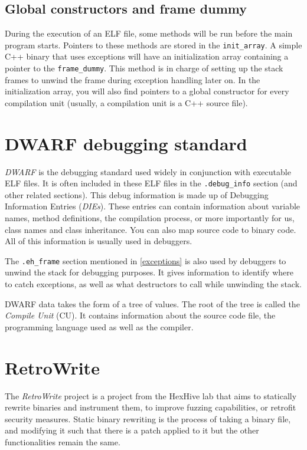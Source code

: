 \documentclass[a4paper,11pt,oneside]{report}
\begin{document}
\subsection{Global constructors and frame dummy}
\label{framedummy}

During the execution of an ELF file, some methods will be run before the main
program starts. Pointers to these methods are stored in the
\texttt{init\_array}.
A simple C++ binary that uses exceptions will have an initialization array
containing a pointer to the \texttt{frame\_dummy}. This method is in charge of
setting up the stack frames to unwind the frame during exception handling
later on.
In the initialization array, you will also find pointers to a global
constructor for every compilation unit (usually, a compilation unit is a C++
source file).


\section{DWARF debugging standard}
\label{dwarf}

\emph{DWARF} is the debugging standard used widely in conjunction with 
executable ELF files.
It is often included in these ELF files in the \texttt{.debug\_info} section 
(and other related sections).
This debug information is made up of Debugging Information Entries 
(\emph{DIEs}).
These entries can contain information about variable names, method definitions, 
the compilation process, or more importantly for us, class names and class 
inheritance. You can also map source code to binary code.
All of this information is usually used in debuggers.

The \texttt{.eh\_frame} section mentioned in \autoref{exceptions} is also used
by debuggers to unwind the stack for debugging purposes.
It gives information to identify where to catch exceptions, as well as what
destructors to call while unwinding the stack.

DWARF data takes the form of a tree of values.
The root of the tree is called the \emph{Compile Unit} (CU).
It contains information about the source code file, the programming language
used as well as the compiler.


\section{RetroWrite} \label{retrowritesection}

The \emph{RetroWrite}\cite{dinesh20oakland} project is a project from the
HexHive lab that aims to statically rewrite binaries and instrument them, to
improve fuzzing capabilities, or retrofit security measures.
Static binary rewriting is the process of taking a binary file, and modifying
it such that there is a patch applied to it but the other functionalities
remain the same.
\end{document}
